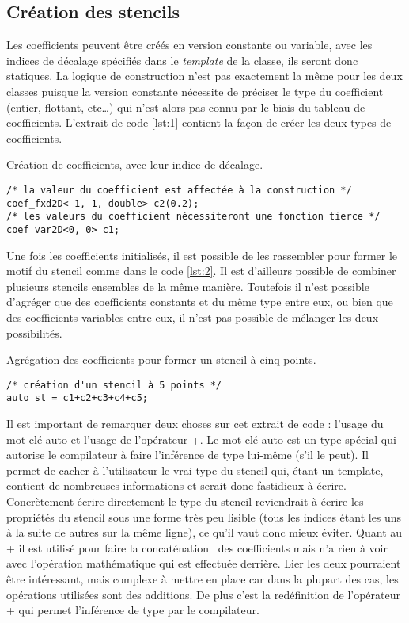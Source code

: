\subsection{Création des stencils}

Les coefficients peuvent être créés en version constante ou variable, avec les indices de décalage spécifiés dans le \emph{template} de la classe, ils seront donc statiques. La logique de construction n'est pas exactement la même pour les deux classes puisque la version constante nécessite de préciser le type du coefficient (entier, flottant, etc\ldots) qui n'est alors pas connu par le biais du tableau de coefficients. L'extrait de code \ref{lst:1} contient la façon de créer les deux types de coefficients.
\begin{listing}[H]
\caption{Création de coefficients, avec leur indice de décalage.}
\label{lst:1}
\begin{verbatim}
/* la valeur du coefficient est affectée à la construction */
coef_fxd2D<-1, 1, double> c2(0.2);
/* les valeurs du coefficient nécessiteront une fonction tierce */
coef_var2D<0, 0> c1;
\end{verbatim}
\end{listing}

Une fois les coefficients initialisés, il est possible de les rassembler pour former le motif du stencil comme dans le code \ref{lst:2}. Il est d'ailleurs possible de combiner plusieurs stencils ensembles de la même manière. Toutefois il n'est possible d'agréger que des coefficients constants et du même type entre eux, ou bien que des coefficients variables entre eux, il n'est pas possible de mélanger les deux possibilités.
\begin{listing}[H]
\caption{Agrégation des coefficients pour former un stencil à cinq points.}
\label{lst:2}
\begin{verbatim}
/* création d'un stencil à 5 points */
auto st = c1+c2+c3+c4+c5; 
\end{verbatim}
\end{listing}
Il est important de remarquer deux choses sur cet extrait de code : l'usage du mot-clé \textsf{auto} et l'usage de l'opérateur \textsf{+}. Le mot-clé \textsf{auto} est un type spécial qui autorise le compilateur à faire l'inférence de type lui-même (s'il le peut). Il permet de cacher à l'utilisateur le vrai type du stencil qui, étant un template, contient de nombreuses informations et serait donc fastidieux à écrire. Concrètement écrire directement le type du stencil reviendrait à écrire les propriétés du stencil sous une forme très peu lisible (tous les indices étant les uns à la suite de autres sur la même ligne), ce qu'il vaut donc mieux éviter. Quant au \textsf{+} il est utilisé pour faire la \og concaténation \fg~des coefficients mais n'a rien à voir avec l'opération mathématique qui est effectuée derrière. Lier les deux pourraient être intéressant, mais complexe à mettre en place car dans la plupart des cas, les opérations utilisées sont des additions. De plus c'est la redéfinition de l'opérateur \textsf{+} qui permet l'inférence de type par le compilateur.

